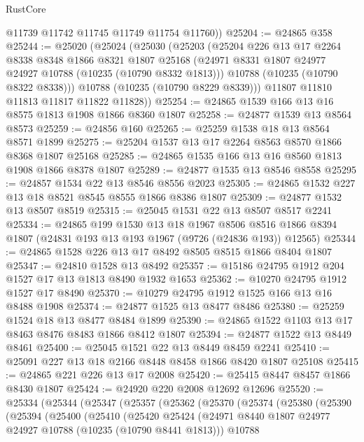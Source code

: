 \begin{lexlean}{RustCore}
\begin{coremodule}
        @11739
        @11742
        @11745
        @11749
        @11754
        @11760))
@25204 := @24865 @358
@25244 := @25020
    (@25024
      (@25030
        (@25203
          (@25204
            @226
            @13
            @17
            @2264
            @8338
            @8348
            @1866
            @8321
            @1807
            @25168
            (@24971 @8331 @1807 @24977 @24927 @10788 (@10235 (@10790 @8332 @1813)))
            @10788
            (@10235 (@10790 @8322 @8338)))
          @10788
          (@10235 (@10790 @8229 @8339)))
        @11807
        @11810
        @11813
        @11817
        @11822
        @11828))
@25254 := @24865 @1539 @166 @13 @16 @8575 @1813 @1908 @1866 @8360 @1807
@25258 := @24877 @1539 @13 @8564 @8573
@25259 := @24856 @160
@25265 := @25259 @1538 @18 @13 @8564 @8571 @1899
@25275 := @25204 @1537 @13 @17 @2264 @8563 @8570 @1866 @8368 @1807 @25168
@25285 := @24865 @1535 @166 @13 @16 @8560 @1813 @1908 @1866 @8378 @1807
@25289 := @24877 @1535 @13 @8546 @8558
@25295 := @24857 @1534 @22 @13 @8546 @8556 @2023
@25305 := @24865 @1532 @227 @13 @18 @8521 @8545 @8555 @1866 @8386 @1807
@25309 := @24877 @1532 @13 @8507 @8519
@25315 := @25045 @1531 @22 @13 @8507 @8517 @2241
@25334 := @24865
    @199
    @1530
    @13
    @18
    @1967
    @8506
    @8516
    @1866
    @8394
    @1807
    (@24831 @193 @13 @193 @1967 (@9726 (@24836 @193)) @12565)
@25344 := @24865 @1528 @226 @13 @17 @8492 @8505 @8515 @1866 @8404 @1807
@25347 := @24810 @1528 @13 @8492
@25357 := @15186 @24795 @1912 @204 @1527 @17 @13 @1813 @8490 @1932 @1653
@25362 := @10270 @24795 @1912 @1527 @17 @8490
@25370 := @10279 @24795 @1912 @1525 @166 @13 @16 @8488 @1908
@25374 := @24877 @1525 @13 @8477 @8486
@25380 := @25259 @1524 @18 @13 @8477 @8484 @1899
@25390 := @24865 @1522 @1103 @13 @17 @8463 @8476 @8483 @1866 @8412 @1807
@25394 := @24877 @1522 @13 @8449 @8461
@25400 := @25045 @1521 @22 @13 @8449 @8459 @2241
@25410 := @25091 @227 @13 @18 @2166 @8448 @8458 @1866 @8420 @1807 @25108
@25415 := @24865 @221 @226 @13 @17 @2008
@25420 := @25415 @8447 @8457 @1866 @8430 @1807
@25424 := @24920 @220 @2008 @12692 @12696
@25520 := @25334
    (@25344
      (@25347
        (@25357
          (@25362
            (@25370
              (@25374
                (@25380
                  (@25390
                    (@25394
                      (@25400
                        (@25410
                          (@25420
                            @25424
                            (@24971 @8440 @1807 @24977 @24927 @10788 (@10235 (@10790 @8441 @1813)))
                            @10788

\end{coremodule}
\end{lexlean}
